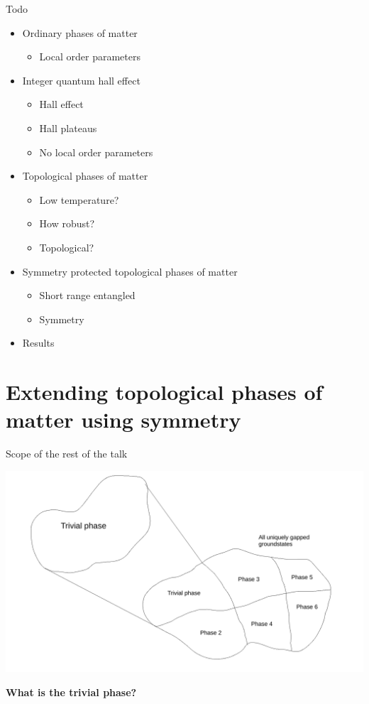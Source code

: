 \documentclass{beamer}
\begin{document}
\begin{frame}{Todo}
	\begin{itemize}
		\item[\done] Ordinary phases of matter
		\begin{itemize}
			\item[\done] Local order parameters
		\end{itemize}
		\item[\done] Integer quantum hall effect
		\begin{itemize}
			\item[\done] Hall effect
			\item[\done] Hall plateaus
			\item[\done] No local order parameters
		\end{itemize}
		\item[\done] Topological phases of matter
		\begin{itemize}
			\item[\done] Low temperature?
			\item[\done] How robust?
			\item[\done] Topological?
		\end{itemize}
		\item[\todo] Symmetry protected topological phases of matter
		\begin{itemize}
			\item[\todo] Short range entangled
			\item[\todo] Symmetry
		\end{itemize}
		\item[\todo] Results
	\end{itemize}
\end{frame}

\section{Extending topological phases of matter using symmetry}
\begin{frame}{Scope of the rest of the talk}
	\begin{center}
		\includegraphics[width=\textwidth]{Images/TrivialGappedPhaseOfQuantumMatter.pdf}
	\end{center}
	\textbf{What is the trivial phase?}
\end{frame}
\end{document}
